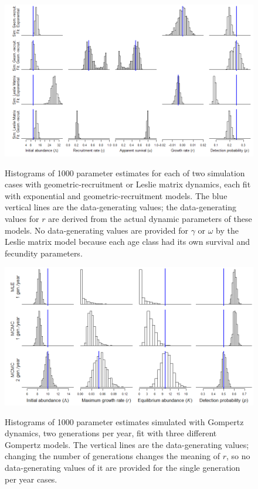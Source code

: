\documentclass{article}
\begin{document}
\begin{landscape}
\begin{figure}
\caption{Histograms of 1000 parameter estimates for each of two
simulation cases with geometric-recruitment or Leslie matrix dynamics, each fit with 
exponential and geometric-recruitment models. The blue vertical lines are the 
data-generating values; the data-generating values for $r$ are derived from
the actual dynamic parameters of these models.  No data-generating values
are provided for $\gamma$ or $\omega$ by the Leslie matrix model because
each age class had its own survival and fecundity parameters.}
  \centering
  \includegraphics{../figs/geom_mat_hists}
\label{fig:geom_mat_hists}
\end{figure}

\begin{figure}
\caption{Histograms of 1000 parameter estimates simulated with Gompertz dynamics, 
two generations per year, fit with three different Gompertz models.
The vertical lines are the data-generating values; changing the number of generations
changes the meaning of $r$, so no data-generating values of it are provided for the 
single generation per year cases.}
  \centering
  \includegraphics{../figs/gomp_hists}
\label{fig:gomp_hists}
\end{figure}
\end{landscape}
\end{document}
